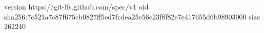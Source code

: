 version https://git-lfs.github.com/spec/v1
oid sha256:7c521a7c87f675cb0827ff5ed7fcdea25e56c23f8f82e7e417655d6b98903000
size 262240
